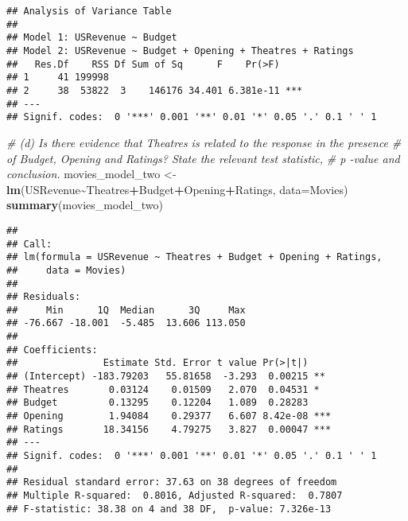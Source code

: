 \documentclass[
]{article}
\newenvironment{Shaded}{\begin{snugshade}}{\end{snugshade}}
\newcommand{\AttributeTok}[1]{\textcolor[rgb]{0.13,0.29,0.53}{#1}}
\newcommand{\CommentTok}[1]{\textcolor[rgb]{0.56,0.35,0.01}{\textit{#1}}}
\newcommand{\FunctionTok}[1]{\textcolor[rgb]{0.13,0.29,0.53}{\textbf{#1}}}
\newcommand{\NormalTok}[1]{#1}
\newcommand{\OtherTok}[1]{\textcolor[rgb]{0.56,0.35,0.01}{#1}}
\newcommand{\SpecialCharTok}[1]{\textcolor[rgb]{0.81,0.36,0.00}{\textbf{#1}}}
\begin{document}
\begin{verbatim}
## Analysis of Variance Table
## 
## Model 1: USRevenue ~ Budget
## Model 2: USRevenue ~ Budget + Opening + Theatres + Ratings
##   Res.Df    RSS Df Sum of Sq      F    Pr(>F)    
## 1     41 199998                                  
## 2     38  53822  3    146176 34.401 6.381e-11 ***
## ---
## Signif. codes:  0 '***' 0.001 '**' 0.01 '*' 0.05 '.' 0.1 ' ' 1
\end{verbatim}

\begin{Shaded}
\begin{Highlighting}[]
\CommentTok{\# (d) Is there evidence that Theatres is related to the response in the presence }
\CommentTok{\# of Budget, Opening and Ratings? State the relevant test statistic,  }
\CommentTok{\# p {-}value and conclusion.}
\NormalTok{movies\_model\_two }\OtherTok{\textless{}{-}} \FunctionTok{lm}\NormalTok{(USRevenue}\SpecialCharTok{\textasciitilde{}}\NormalTok{Theatres}\SpecialCharTok{+}\NormalTok{Budget}\SpecialCharTok{+}\NormalTok{Opening}\SpecialCharTok{+}\NormalTok{Ratings, }\AttributeTok{data=}\NormalTok{Movies)}
\FunctionTok{summary}\NormalTok{(movies\_model\_two)}
\end{Highlighting}
\end{Shaded}

\begin{verbatim}
## 
## Call:
## lm(formula = USRevenue ~ Theatres + Budget + Opening + Ratings, 
##     data = Movies)
## 
## Residuals:
##     Min      1Q  Median      3Q     Max 
## -76.667 -18.001  -5.485  13.606 113.050 
## 
## Coefficients:
##               Estimate Std. Error t value Pr(>|t|)    
## (Intercept) -183.79203   55.81658  -3.293  0.00215 ** 
## Theatres       0.03124    0.01509   2.070  0.04531 *  
## Budget         0.13295    0.12204   1.089  0.28283    
## Opening        1.94084    0.29377   6.607 8.42e-08 ***
## Ratings       18.34156    4.79275   3.827  0.00047 ***
## ---
## Signif. codes:  0 '***' 0.001 '**' 0.01 '*' 0.05 '.' 0.1 ' ' 1
## 
## Residual standard error: 37.63 on 38 degrees of freedom
## Multiple R-squared:  0.8016, Adjusted R-squared:  0.7807 
## F-statistic: 38.38 on 4 and 38 DF,  p-value: 7.326e-13
\end{verbatim}
\end{document}
